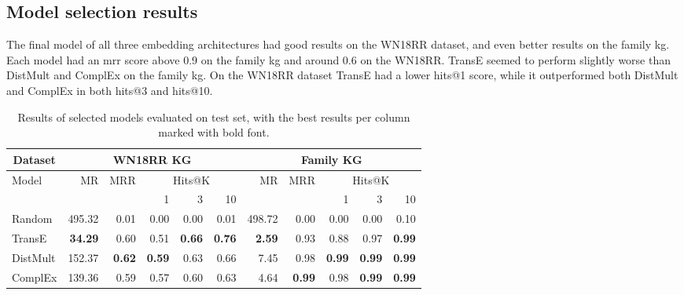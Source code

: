 \subsection{Model selection results}
The final model of all three embedding architectures had good results on the WN18RR dataset, and even better results on the family \gls{kg}. Each model had an \gls{mrr} score above 0.9 on the family \gls{kg} and around 0.6 on the WN18RR. TransE seemed to perform slightly worse than DistMult and ComplEx on the family \gls{kg}. On the WN18RR dataset TransE had a lower hits@1 score, while it outperformed both DistMult and ComplEx in both hits@3 and hits@10.
\begin{table}[thbp]
\centering
\begin{tabular}{@{}lrrrrrrrrrr@{}}
\multicolumn{1}{c}{Dataset} & \multicolumn{5}{c}{WN18RR KG}                                           & \multicolumn{5}{c}{Family KG}                                           \\ \midrule
\multirow{2}{*}{Model}      & \multirow{2}{*}{MR} & \multirow{2}{*}{MRR} & \multicolumn{3}{c}{Hits@K}       & \multirow{2}{*}{MR} & \multirow{2}{*}{MRR} & \multicolumn{3}{c}{Hits@K} \\ \cmidrule(lr){4-6} \cmidrule(l){9-11} 
                            &                     &                      & 1            & 3                 & 10              &               &                      & 1             & 3       & 10     \\ \midrule
Random                      & 495.32              & 0.01                 & 0.00         & 0.00              & 0.01            & 498.72        & 0.00                 & 0.00          & 0.00    & 0.10   \\
TransE                      & \textbf{34.29}      & 0.60                 & 0.51         & \textbf{0.66}     & \textbf{0.76}   & \textbf{2.59} & 0.93                 & 0.88          & 0.97    & \textbf{0.99}   \\
DistMult                    & 152.37              & \textbf{0.62}        & \textbf{0.59}& 0.63              & 0.66            & 7.45          & 0.98                 & \textbf{0.99} & \textbf{0.99}    & \textbf{0.99}   \\
ComplEx                     & 139.36              & 0.59                 & 0.57         & 0.60              & 0.63            & 4.64          & \textbf{0.99}        & 0.98          & \textbf{0.99}    & \textbf{0.99}   \\ 
\end{tabular}
\caption[Test results of selected model.]{Results of selected models evaluated on test set, with the best results per column marked with bold font.}
\end{table}


